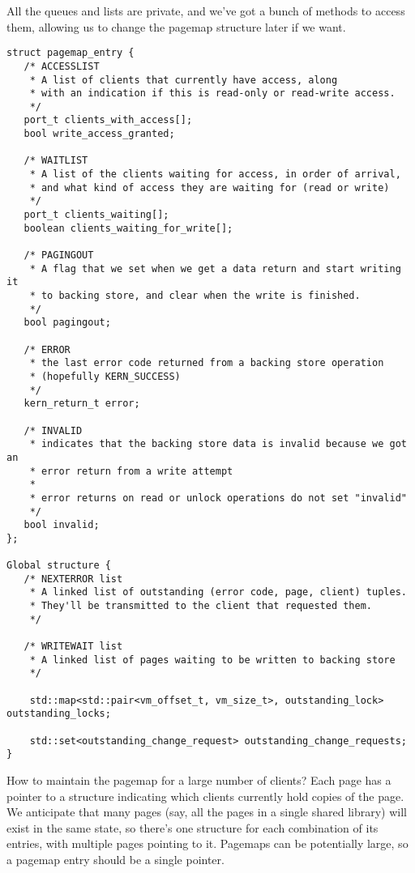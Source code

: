 \documentclass{article}
\begin{document}
All the queues and lists are private, and we've got a bunch of methods
to access them, allowing us to change the pagemap structure later if
we want.

\begin{verbatim}
struct pagemap_entry {
   /* ACCESSLIST
    * A list of clients that currently have access, along
    * with an indication if this is read-only or read-write access.
    */
   port_t clients_with_access[];
   bool write_access_granted;

   /* WAITLIST
    * A list of the clients waiting for access, in order of arrival,
    * and what kind of access they are waiting for (read or write)
    */
   port_t clients_waiting[];
   boolean clients_waiting_for_write[];

   /* PAGINGOUT
    * A flag that we set when we get a data return and start writing it
    * to backing store, and clear when the write is finished.
    */
   bool pagingout;

   /* ERROR
    * the last error code returned from a backing store operation
    * (hopefully KERN_SUCCESS)
    */
   kern_return_t error;

   /* INVALID
    * indicates that the backing store data is invalid because we got an
    * error return from a write attempt
    *
    * error returns on read or unlock operations do not set "invalid"
    */
   bool invalid;
};

Global structure {
   /* NEXTERROR list
    * A linked list of outstanding (error code, page, client) tuples.
    * They'll be transmitted to the client that requested them.
    */

   /* WRITEWAIT list
    * A linked list of pages waiting to be written to backing store
    */

    std::map<std::pair<vm_offset_t, vm_size_t>, outstanding_lock> outstanding_locks;

    std::set<outstanding_change_request> outstanding_change_requests;
}
\end{verbatim}

How to maintain the pagemap for a large number of clients?  Each page
has a pointer to a structure indicating which clients currently hold
copies of the page.  We anticipate that many pages (say, all the pages
in a single shared library) will exist in the same state, so there's
one structure for each combination of its entries, with multiple pages
pointing to it.  Pagemaps can be potentially large, so a pagemap entry
should be a single pointer.
\end{document}
